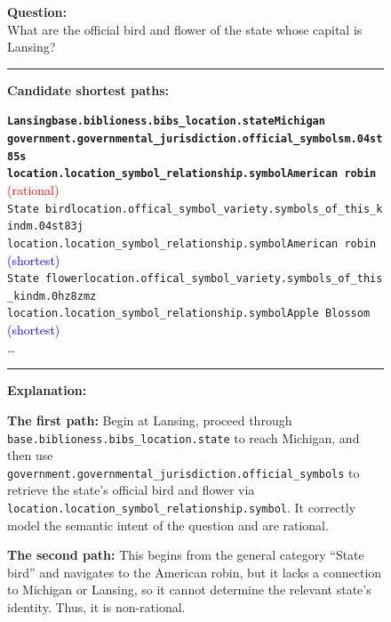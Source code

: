 \begin{figure}[t]
\begin{tcolorbox}[colback=gray!5!white,
                  colframe=gray!75!black,
                  title=WebQTrn-2349\_e831da3802943dad506eb1e3fb611847]
\scriptsize

\textbf{Question:}\\
What are the official bird and flower of the state whose capital is Lansing?

\rule{\linewidth}{0.4pt}

\textbf{Candidate shortest paths:}\\[2pt]
{\raggedright
\texttt{\textbf{Lansing\patharrow base.biblioness.bibs\_location.state\patharrow Michigan \\ \patharrow government.governmental\_jurisdiction.official\_symbols\patharrow m.04st85s \\ \patharrow location.location\_symbol\_relationship.symbol\patharrow American robin}}\hfill
\textcolor{red}{(rational)}\\[6pt]


\texttt{State bird\patharrow location.offical\_symbol\_variety.symbols\_of\_this\_kind\patharrow m.04st83j \\ \patharrow location.location\_symbol\_relationship.symbol\patharrow American robin}\hfill
\textcolor{blue}{(shortest)}\\[6pt]

\texttt{State flower\patharrow location.offical\_symbol\_variety.symbols\_of\_this\_kind\patharrow m.0hz8zmz \\ \patharrow location.location\_symbol\_relationship.symbol\patharrow Apple Blossom}\hfill
\textcolor{blue}{(shortest)}\\[6pt]
\ldots
\par}

\rule{\linewidth}{0.4pt}

\textbf{Explanation:}\\[2pt]
{\raggedright
\textbf{The first path:} Begin at Lansing, proceed through \texttt{base.biblioness.bibs\_location.state} to reach Michigan, and then use \texttt{government.governmental\_jurisdiction.official\_symbols} to retrieve the state’s official bird and flower via \texttt{location.location\_symbol\_relationship.symbol}. It correctly model the semantic intent of the question and are rational.\par\vspace{6pt}

\textbf{The second path:} This begins from the general category “State bird” and navigates to the American robin, but it lacks a connection to Michigan or Lansing, so it cannot determine the relevant state’s identity. Thus, it is non-rational.\par\vspace{6pt}

}
\end{tcolorbox}
\end{figure}
